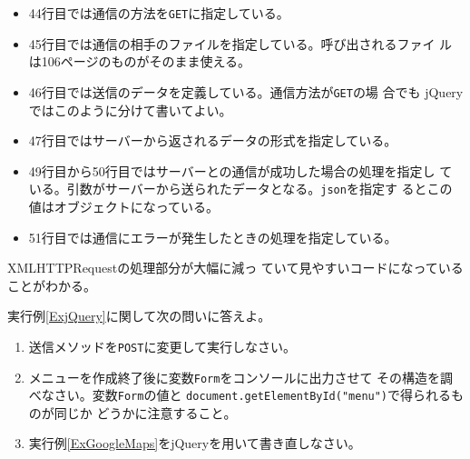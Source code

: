 \begin{Exec}
\begin{itemize}
\begin{itemize}
 \item 44行目では通信の方法を\texttt{GET}に指定している。
 \item 45行目では通信の相手のファイルを指定している。呼び出されるファイ
       ルは106ページのものがそのまま使える。
 \item 46行目では送信のデータを定義している。通信方法が\texttt{GET}の場
       合でも jQuery ではこのように分けて書いてよい。
 \item 47行目ではサーバーから返されるデータの形式を指定している。
 \item 49行目から50行目ではサーバーとの通信が成功した場合の処理を指定し
       ている。引数がサーバーから送られたデータとなる。\texttt{json}を指定す
       るとこの値はオブジェクトになっている。
 \item 51行目では通信にエラーが発生したときの処理を指定している。
\end{itemize}
         XMLHTTPRequestの処理部分が大幅に減っ
	       ていて見やすいコードになっていることがわかる。
 \end{itemize}
 \end{Exec}
 \begin{Prob}\upshape
  実行例\ref{ExjQuery}に関して次の問いに答えよ。
\begin{enumerate}
   \item 送信メソッドを\texttt{POST}に変更して実行しなさい。
   \item メニューを作成終了後に変数\texttt{Form}をコンソールに出力させて
         その構造を調べなさい。変数\texttt{Form}の値と
         \texttt{document.getElementById("menu")}で得られるものが同じか
         どうかに注意すること。
   \item   実行例\ref{ExGoogleMaps}をjQueryを用いて書き直しなさい。
\end{enumerate}
 \end{Prob}
